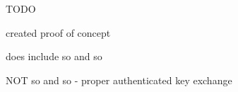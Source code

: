 
TODO

created proof of concept

does include so and so

NOT so and so
- proper authenticated key exchange
